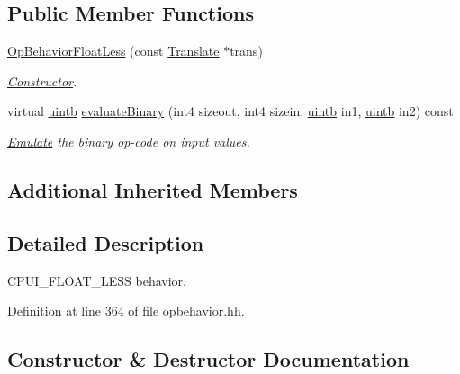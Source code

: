 \subsection*{Public Member Functions}
\begin{DoxyCompactItemize}
\item 
\mbox{\hyperlink{class_op_behavior_float_less_a28cd98af8e68fbef3cfa3f21cf4ece5d}{Op\+Behavior\+Float\+Less}} (const \mbox{\hyperlink{class_translate}{Translate}} $\ast$trans)
\begin{DoxyCompactList}\small\item\em \mbox{\hyperlink{class_constructor}{Constructor}}. \end{DoxyCompactList}\item 
virtual \mbox{\hyperlink{types_8h_a2db313c5d32a12b01d26ac9b3bca178f}{uintb}} \mbox{\hyperlink{class_op_behavior_float_less_aebfcafcb2f22f7d30a4df0999b248b4f}{evaluate\+Binary}} (int4 sizeout, int4 sizein, \mbox{\hyperlink{types_8h_a2db313c5d32a12b01d26ac9b3bca178f}{uintb}} in1, \mbox{\hyperlink{types_8h_a2db313c5d32a12b01d26ac9b3bca178f}{uintb}} in2) const
\begin{DoxyCompactList}\small\item\em \mbox{\hyperlink{class_emulate}{Emulate}} the binary op-\/code on input values. \end{DoxyCompactList}\end{DoxyCompactItemize}
\subsection*{Additional Inherited Members}


\subsection{Detailed Description}
C\+P\+U\+I\+\_\+\+F\+L\+O\+A\+T\+\_\+\+L\+E\+SS behavior. 

Definition at line 364 of file opbehavior.\+hh.



\subsection{Constructor \& Destructor Documentation}
\mbox{\label{class_op_behavior_float_less_a28cd98af8e68fbef3cfa3f21cf4ece5d}} 
